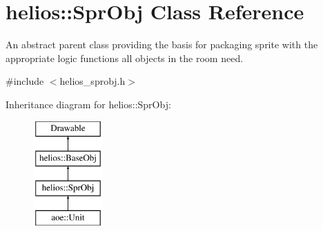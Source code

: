 \hypertarget{classhelios_1_1_spr_obj}{}\section{helios\+:\+:Spr\+Obj Class Reference}
\label{classhelios_1_1_spr_obj}


An abstract parent class providing the basis for packaging sprite with the appropriate logic functions all objects in the room need.  




{\ttfamily \#include $<$helios\+\_\+sprobj.\+h$>$}

Inheritance diagram for helios\+:\+:Spr\+Obj\+:\begin{figure}[H]
\begin{center}
\leavevmode
\includegraphics[height=4.000000cm]{classhelios_1_1_spr_obj}
\end{center}
\end{figure}
